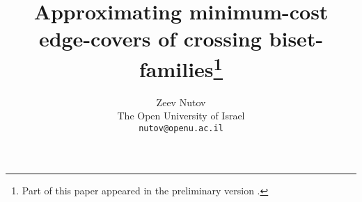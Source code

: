 
\setlength{\textheight}{8.8in}
\setlength{\textwidth}{6.5in}
\setlength{\evensidemargin}{-0.18in}
\setlength{\oddsidemargin}{-0.18in}
\setlength{\headheight}{0in}
\setlength{\headsep}{10pt}
\setlength{\topsep}{0in}
\setlength{\topmargin}{0.0in}
\setlength{\itemsep}{0in}      \renewcommand{\baselinestretch}{1.2}
\parskip=0.080in

\newcommand {\ignore} [1] {}

\newtheorem{theorem}{Theorem}[section]
\newtheorem{lemma}[theorem]{Lemma}
\newtheorem{fact}[theorem]{Fact}
\newtheorem{corollary}[theorem]{Corollary}
\newtheorem{definition}{Definition}[section]
\newtheorem{proposition}[theorem]{Proposition}
\newtheorem{observation}[theorem]{Observation}
\newtheorem{claim}[theorem]{Claim}
\newtheorem{assumption}[theorem]{Assumption}
\newtheorem{notation}[theorem]{Notation}
\newenvironment{proof}{\noindent{\bf Proof:\/}}{\hfill \vskip 0.1in}
\newenvironment{proofsp}{\noindent{\bf Proof}}{\hfill \vskip 0.1in}



\date{}

\title{Approximating minimum-cost edge-covers of crossing biset-families\thanks{Part of this paper 
appeared in the preliminary version \cite{N}.}}

\author{
Zeev Nutov \\
\small The Open University of Israel \\
\small {\tt nutov@openu.ac.il}
}

\maketitle

